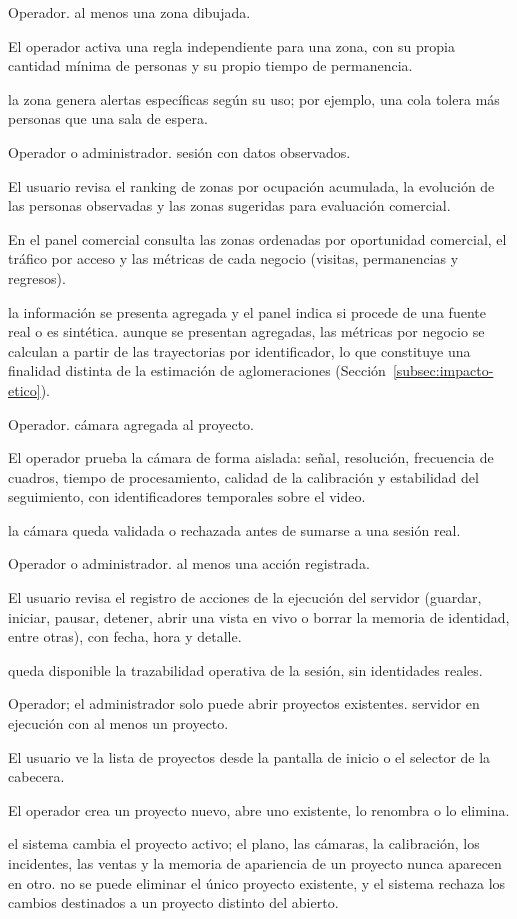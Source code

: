   {Operador.}
  {al menos una zona dibujada.}
  {\item El operador activa una regla independiente para una zona, con su propia cantidad mínima
         de personas y su propio tiempo de permanencia.}
  {la zona genera alertas específicas según su uso; por ejemplo, una cola tolera más personas
   que una sala de espera.}
  {}

  {Operador o administrador.}
  {sesión con datos observados.}
  {\item El usuario revisa el ranking de zonas por ocupación acumulada, la evolución de las
         personas observadas y las zonas sugeridas para evaluación comercial.
   \item En el panel comercial consulta las zonas ordenadas por oportunidad comercial, el
         tráfico por acceso y las métricas de cada negocio (visitas, permanencias y regresos).}
  {la información se presenta agregada y el panel indica si procede de una fuente real o es
   sintética.}
  {aunque se presentan agregadas, las métricas por negocio se calculan a partir de las
   trayectorias por identificador, lo que constituye una finalidad distinta de la estimación de
   aglomeraciones (Sección~\ref{subsec:impacto-etico}).}

  {Operador.}
  {cámara agregada al proyecto.}
  {\item El operador prueba la cámara de forma aislada: señal, resolución, frecuencia de cuadros,
         tiempo de procesamiento, calidad de la calibración y estabilidad del seguimiento, con
         identificadores temporales sobre el video.}
  {la cámara queda validada o rechazada antes de sumarse a una sesión real.}
  {}

  {Operador o administrador.}
  {al menos una acción registrada.}
  {\item El usuario revisa el registro de acciones de la ejecución del servidor (guardar, iniciar,
         pausar, detener, abrir una vista en vivo o borrar la memoria de identidad, entre otras),
         con fecha, hora y detalle.}
  {queda disponible la trazabilidad operativa de la sesión, sin identidades reales.}
  {}

  {Operador; el administrador solo puede abrir proyectos existentes.}
  {servidor en ejecución con al menos un proyecto.}
  {\item El usuario ve la lista de proyectos desde la pantalla de inicio o el selector de la
         cabecera.
   \item El operador crea un proyecto nuevo, abre uno existente, lo renombra o lo elimina.}
  {el sistema cambia el proyecto activo; el plano, las cámaras, la calibración, los incidentes, las
   ventas y la memoria de apariencia de un proyecto nunca aparecen en otro.}
  {no se puede eliminar el único proyecto existente, y el sistema rechaza los cambios destinados
   a un proyecto distinto del abierto.}

